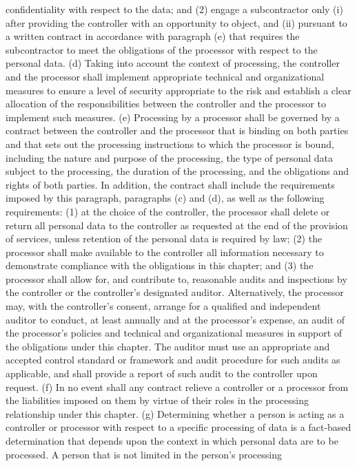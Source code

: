 confidentiality with respect to the data; and
(2) engage a subcontractor only (i) after providing the controller with an opportunity to
object, and (ii) pursuant to a written contract in accordance with paragraph (e) that requires
the subcontractor to meet the obligations of the processor with respect to the personal data.
(d) Taking into account the context of processing, the controller and the processor shall
implement appropriate technical and organizational measures to ensure a level of security
appropriate to the risk and establish a clear allocation of the responsibilities between the
controller and the processor to implement such measures.
(e) Processing by a processor shall be governed by a contract between the controller and
the processor that is binding on both parties and that sets out the processing instructions to
which the processor is bound, including the nature and purpose of the processing, the type
of personal data subject to the processing, the duration of the processing, and the obligations
and rights of both parties. In addition, the contract shall include the requirements imposed
by this paragraph, paragraphs (c) and (d), as well as the following requirements:
(1) at the choice of the controller, the processor shall delete or return all personal data
to the controller as requested at the end of the provision of services, unless retention of the
personal data is required by law;
(2) the processor shall make available to the controller all information necessary to
demonstrate compliance with the obligations in this chapter; and
(3) the processor shall allow for, and contribute to, reasonable audits and inspections by
the controller or the controller's designated auditor. Alternatively, the processor may, with
the controller's consent, arrange for a qualified and independent auditor to conduct, at least
annually and at the processor's expense, an audit of the processor's policies and technical
and organizational measures in support of the obligations under this chapter. The auditor
must use an appropriate and accepted control standard or framework and audit procedure
for such audits as applicable, and shall provide a report of such audit to the controller upon
request.
(f) In no event shall any contract relieve a controller or a processor from the liabilities
imposed on them by virtue of their roles in the processing relationship under this chapter.
(g) Determining whether a person is acting as a controller or processor with respect to
a specific processing of data is a fact-based determination that depends upon the context in
which personal data are to be processed. A person that is not limited in the person's processing
